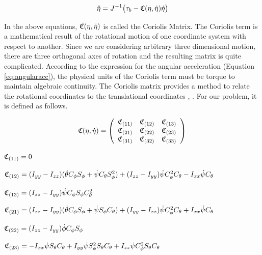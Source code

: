 \begin{equation}
    \label{eq:angularacc}
    \ddot{\eta} = J^{-1} \big( \tau_b - \cc(\eta,\dot{\eta}) \dot{\eta} \big) 
\end{equation}

In the above equations, $\mathfrak{C}(\eta,\dot{\eta})$ is called the Coriolis Matrix. The Coriolis term is a mathematical result of the rotational motion of one coordinate system with respect to another. Since we are considering arbitrary three dimensional motion, there are three orthogonal axes of rotation and the resulting matrix is quite complicated. According to the expression for the angular acceleration (Equation \eqref{eq:angularacc}), the physical units of the Coriolis term must be torque to maintain algebraic continuity. The Coriolis matrix provides a method to relate the rotational coordinates to the translational coordinates \cite{Coriolis}, \cite{Hestenes}. For our problem, it is defined as follows.

\begin{equation}
\label{cor}
    \cc(\eta,\dot{\eta}) = 
    \left(
        \begin{array}{c c c}
            \cc_{(11)} & \cc_{(12)} & \cc_{(13)} \\
            \cc_{(21)} & \cc_{(22)} & \cc_{(23)} \\
            \cc_{(31)} & \cc_{(32)} & \cc_{(33)} \\
        \end{array}
    \right)
\end{equation}




$\mathfrak{C}_{(11)} = 0$

$\mathfrak{C}_{(12)}  = (I_{yy}-I_{zz})  ( \dot{\theta} C_{\phi} S_{\phi} +  \dot{\psi} C_{\theta} S_{\phi}^2 )  + (I_{zz}-I_{yy})  \dot{\psi} C_{\phi}^2 C_{\theta} - I_{xx}  \dot{\psi} C_{\theta}$


$\mathfrak{C}_{(13)} = (I_{zz}-I_{yy})    \dot{\psi}   C_{\phi}   S_{\phi}  C_{\theta}^2$


$\mathfrak{C}_{(21)} = (I_{zz}-I_{yy})   ( \dot{\theta} C_{\phi} S_{\phi} +  \dot{\psi} S_{\phi} C_{\theta} ) + (I_{yy}-I_{zz})    \dot{\psi}   C_{\phi}^2  C_{\theta} + I_{xx}    \dot{\psi}   C_{\theta}$


$\mathfrak{C}_{(22)}  = (I_{zz}-I_{yy}) \dot{\phi} C_{\phi} S_{\phi}$


$\mathfrak{C}_{(23)}  = -I_{xx}  \dot{\psi} S_{\theta} C_{\theta} + I_{yy}  \dot{\psi} S_{\phi}^2 S_{\theta} C_{\theta} + I_{zz} \dot{\psi} C_{\phi}^2 S_{\theta} C_{\theta}$


